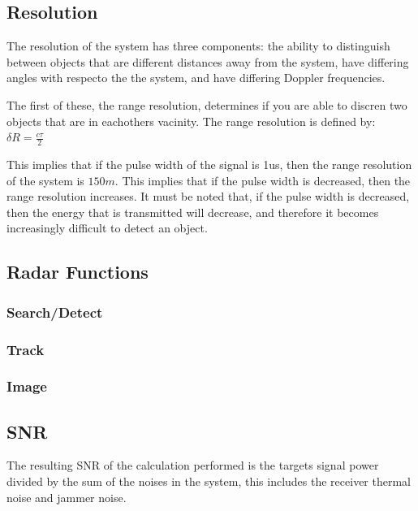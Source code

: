 \documentclass[11pt]{witseiepaper}
\begin{document}
\subsection{Resolution}

The resolution of the system has three components: the ability to distinguish between objects that are different distances away from the system, have differing angles with respecto the the system, and have differing Doppler frequencies.

The first of these, the range resolution, determines if you are able to discren two objects that are in eachothers vacinity.
The range resolution is defined by:
$\delta R = \frac{c \tau}{2}$

This implies that if the pulse width of the signal is 1us, then the range resolution of the system is $150 m$. This implies that if the pulse width is decreased, then the range resolution increases.
It must be noted that, if the pulse width is decreased, then the energy that is transmitted will decrease, and therefore it becomes increasingly difficult to detect an object.


\subsection{Radar Functions}

\subsubsection{Search/Detect}

\subsubsection{Track}

\subsubsection{Image}

\subsection{SNR}

The resulting SNR of the calculation performed is the targets signal power divided by the sum of the noises in the system, this includes the receiver thermal noise and jammer noise.
\end{document}
